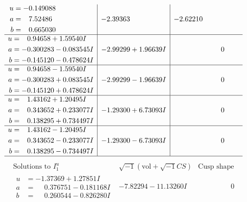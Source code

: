 \documentclass[1p]{elsarticle_modified}
\theoremstyle{definition}
\newcommand{\I}{\sqrt{-1}}
\begin{document}
$$\begin{array}{c|c|c}
\begin{aligned}
u &= -0.149088\phantom{ +0.000000I} \\
a &= \phantom{-}7.52486\phantom{ +0.000000I} \\
b &= \phantom{-}0.665030\phantom{ +0.000000I}\end{aligned}
 & -2.39363\phantom{ +0.000000I} & -2.62210\phantom{ +0.000000I} \\ \hline\begin{aligned}
u &= \phantom{-}0.94658 + 1.59540 I \\
a &= -0.300283 - 0.083545 I \\
b &= -0.145120 - 0.478624 I\end{aligned}
 & -2.99299 + 1.96639 I & \phantom{-0.000000 } 0 \\ \hline\begin{aligned}
u &= \phantom{-}0.94658 - 1.59540 I \\
a &= -0.300283 + 0.083545 I \\
b &= -0.145120 + 0.478624 I\end{aligned}
 & -2.99299 - 1.96639 I & \phantom{-0.000000 } 0 \\ \hline\begin{aligned}
u &= \phantom{-}1.43162 + 1.20495 I \\
a &= \phantom{-}0.343652 + 0.233077 I \\
b &= \phantom{-}0.138295 + 0.734497 I\end{aligned}
 & -1.29300 + 6.73093 I & \phantom{-0.000000 } 0 \\ \hline\begin{aligned}
u &= \phantom{-}1.43162 - 1.20495 I \\
a &= \phantom{-}0.343652 - 0.233077 I \\
b &= \phantom{-}0.138295 - 0.734497 I\end{aligned}
 & -1.29300 - 6.73093 I & \phantom{-0.000000 } 0\\
 \hline 
 \end{array}$$\newpage$$\begin{array}{c|c|c}  
\text{Solutions to }I^u_{1}& \I (\text{vol} + \sqrt{-1}CS) & \text{Cusp shape}\\
 \hline 
\begin{aligned}
u &= -1.37369 + 1.27851 I \\
a &= \phantom{-}0.376751 - 0.181168 I \\
b &= \phantom{-}0.260544 - 0.826280 I\end{aligned}
 & -7.82294 - 11.13260 I & \phantom{-0.000000 } 0 \\ \hline\begin{aligned}

\end{aligned}
\end{array}$$
\end{document}
